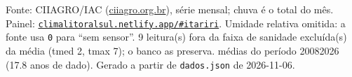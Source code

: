 \documentclass[10pt,a4paper]{article}
\begin{document}
\vspace{1pt}
{\tiny\color{cinza}
Fonte: CIIAGRO/IAC (\href{http://ciiagro.org.br}{ciiagro.org.br}), série mensal;
chuva é o total do mês. Painel:
\href{https://climalitoralsul.netlify.app/\#itariri}%
{\texttt{climalitoralsul.netlify.app/\#itariri}}.
Umidade relativa omitida: a fonte usa \texttt{0} para ``sem sensor''.  9 leitura(s) fora da faixa de sanidade excluída(s) da média (tmed 2, tmax 7); o banco as preserva.
médias do período 2008\textendash{}2026 (17.8 anos de dado).
Gerado a partir de \texttt{dados.json} de 2026-11-06.}
\end{document}

